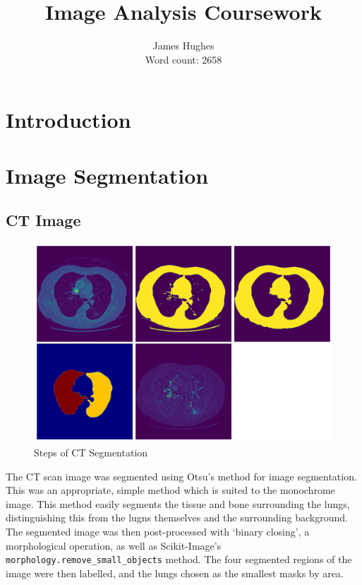 \documentclass[12pt]{article}
\title{Image Analysis Coursework}
\author{James Hughes\\ Word count: 2658}
\begin{document}
\maketitle

\newpage

\tableofcontents

\newpage

\section{Introduction}

\section{Image Segmentation}

\subsection{CT Image}

\begin{figure}[htp]
    \includegraphics[scale=0.35]{figures/ct_segmentation.png}
    \caption{Steps of CT Segmentation}
    \label{fig:ct}
\end{figure}

The CT scan image was segmented using Otsu's method for image segmentation.
This was an appropriate, simple method which is suited to the monochrome image.
This method easily segments the tissue and bone surrounding the lungs,
distinguishing this from the lugns themselves and the surrounding background.
The segmented image was then post-processed with `binary closing', a morphological operation,
as well as Scikit-Image's \texttt{morphology.remove\_small\_objects} method.
The four segmented regions of the image were then labelled, and the lungs chosen as the smallest masks by area.
\end{document}
